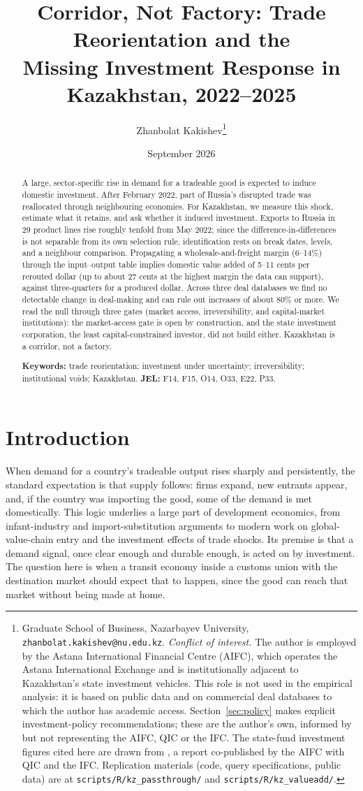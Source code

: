 \documentclass[12pt]{article}
\title{Corridor, Not Factory: Trade Reorientation and the\\
Missing Investment Response in Kazakhstan, 2022--2025}
\author{Zhanbolat Kakishev\thanks{Graduate School of Business, Nazarbayev University, \texttt{zhanbolat.kakishev@nu.edu.kz}.
\emph{Conflict of interest.} The author is employed by the Astana International Financial
Centre (AIFC), which operates the Astana International Exchange and is institutionally adjacent
to Kazakhstan's state investment vehicles. This role is not used in the empirical analysis: it
is based on public data and on commercial deal databases to which the author has academic access.
Section~\ref{sec:policy} makes explicit investment-policy recommendations; these are the
author's own, informed by but not representing the AIFC, QIC or the IFC.
The state-fund investment figures cited here are drawn from \citet{qicaifcifc2026pe}, a report
co-published by the AIFC with QIC and the IFC.
Replication materials (code, query specifications, public data) are at
\texttt{scripts/R/kz\_passthrough/} and \texttt{scripts/R/kz\_valueadd/}.}}
\date{September 2026}
\begin{document}
\maketitle

\begin{abstract}
\noindent A large, sector-specific rise in demand for a tradeable good is expected to induce
domestic investment. After February 2022, part of Russia's disrupted trade was reallocated
through neighbouring economies. For Kazakhstan, we measure this shock, estimate what it
retains, and ask whether it induced investment. Exports to Russia in 29 product lines rise
roughly tenfold from May 2022; since the difference-in-differences is not separable from its
own selection rule, identification rests on break dates, levels, and a neighbour comparison.
Propagating a wholesale-and-freight margin (6--14\%) through the input--output table implies
domestic value added of 5--11 cents per rerouted dollar (up to about 27 cents at the highest margin the data can support), against three-quarters for a produced dollar. Across three deal databases we find no detectable change in deal-making and can rule out increases of about 80\% or more. We read the null through three gates (market access, irreversibility, and capital-market institutions): the market-access gate is open by construction, and the state investment corporation, the least capital-constrained investor, did not build either.
Kazakhstan is a corridor, not a factory.

\medskip
\noindent\textbf{Keywords:} trade reorientation; investment under uncertainty; irreversibility;
institutional voids; Kazakhstan.
\quad\textbf{JEL:} F14, F15, O14, O33, E22, P33.
\end{abstract}

\clearpage

\section{Introduction}

When demand for a country's tradeable output rises sharply and persistently, the standard expectation is that supply follows: firms expand, new entrants appear, and, if the country
was importing the good, some of the demand is met domestically. This logic underlies a large part of development economics, from infant-industry and import-substitution arguments to modern work on global-value-chain entry and the investment effects of trade shocks. Its premise is that a demand signal, once clear enough and durable enough, is acted on by investment. The question here is when a transit economy inside a customs union with the destination market should expect that to happen, since the good can reach that market without being made at home.
\end{document}
